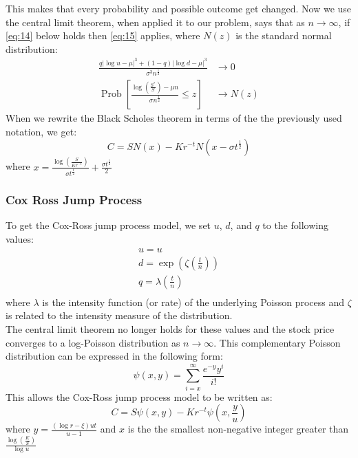 \documentclass{article}
\DeclareMathOperator{\Prob}{Prob}
\begin{document}
This makes that every probability and possible outcome get changed. Now we use the central limit theorem, when applied it to our problem, says that as $n \rightarrow \infty$, if \ref{eq:14} below holds then \ref{eq:15} applies, where $N(z)$ is the standard normal distribution:
\begin{align} \label{eq:14}
    \frac{q|\log u - \mu|^{3} + (1-q)|\log d - \mu|^{3}}{\sigma^{3}n^{\frac{1}{2}}} & \rightarrow 0 \\
    \Prob\left[\frac{\log\left(\frac{S^{*}}{S}\right) - \mu n}{\sigma n^{\frac{1}{2}}} \le z\right] & \rightarrow N(z) \label{eq:15}
\end{align}
When we rewrite the Black Scholes theorem in terms of the the previously used notation, we get:
\begin{equation}
   C =  S N(x) - K r^{-t} N(x - \sigma t^{\frac{1}{2}})
\end{equation}
where $x = \frac{\log\left(\frac{S}{Kr^{-t}}\right)}{\sigma t^{\frac{1}{2}}} + \frac{\sigma t^{\frac{1}{2}}}{2}$
\subsubsection{Cox Ross Jump Process}
To get the Cox-Ross jump process model, we set $u$, $d$, and $q$ to the following values:
\begin{gather*}
    u = u \\
    d = \exp\left(\zeta \left(\frac{t}{n}\right)\right) \\
    q = \lambda \left(\frac{t}{n}\right) \\
\end{gather*}
where $\lambda$ is the intensity function (or rate) of the underlying Poisson process and $\zeta$ is related to the intensity measure of the distribution.\\
The central limit theorem no longer holds for these values and the stock price converges to a log-Poisson distribution as $n \rightarrow \infty$. This complementary Poisson distribution can be expressed in the following form:
\begin{equation}
    \psi (x,y) = \sum_{i=x}^{\infty} \frac{e^{-y}y^{i}}{i!}
\end{equation}
This allows the Cox-Ross jump process model to be written as:
\begin{equation}
    C = S \psi(x,y) - Kr^{-t} \psi\left(x,\frac{y}{u}\right)
\end{equation}
where $y=\frac{(\log r - \xi) u t }{u-1}$ and $x$ is the the smallest non-negative integer greater than $\frac{\log\left(\frac{K}{S}\right)}{\log u}$
\end{document}
